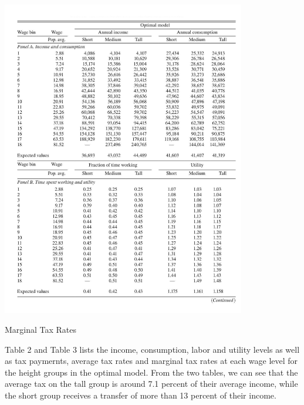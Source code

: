 \documentclass[titlepage]{\econtex}
\begin{document}
\begin{table}[H]
  \centering
  \label{fig:Table 2}
  \includegraphics[width=0.8\textwidth]{OptimalAllocationBaseline1.JPG}
  \caption{Marginal Tax Rates}
  \end{table}


  Table 2 and Table 3 lists the income, consumption, labor and utility levels as well as tax paymernts, average tax rates and marginal tax rates at each wage level for the height groups in the optimal model. From the two tables, we can see that the average tax on the tall group is around 7.1 percent of their average income, while the short group receives a transfer of more than 13 percent of their income.
\end{document}
